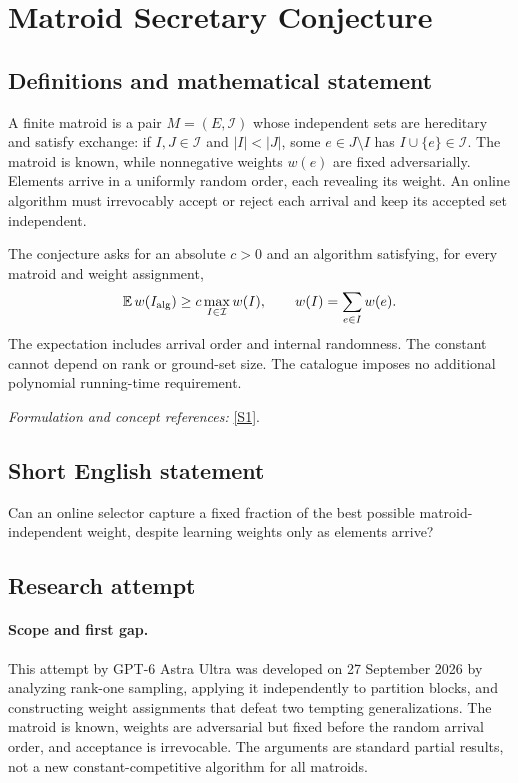 \documentclass[11pt]{article}
\begin{document}
\section*{\texorpdfstring{Matroid Secretary Conjecture}{Matroid Secretary Conjecture}}\label{statement}
\subsection{Definitions and mathematical statement}
A finite matroid is a pair $M=(E,\mathcal I)$ whose independent sets are hereditary and satisfy exchange: if $I,J\in\mathcal I$ and $|I|<|J|$, some $e\in J\setminus I$ has $I\cup\{e\}\in\mathcal I$. The matroid is known, while nonnegative weights $w(e)$ are fixed adversarially. Elements arrive in a uniformly random order, each revealing its weight. An online algorithm must irrevocably accept or reject each arrival and keep its accepted set independent.

The conjecture asks for an absolute $c>0$ and an algorithm satisfying, for every matroid and weight assignment,
\[
 {\mathbb{E}}\,w(I_{\rm alg})\ge c\max_{I\in\mathcal I}w(I),
 \qquad w(I)=\sum_{e\in I}w(e).
\]
The expectation includes arrival order and internal randomness. The constant cannot depend on rank or ground-set size. The catalogue imposes no additional polynomial running-time requirement.
\par\smallskip\textit{Formulation and concept references:} \href{https://drops.dagstuhl.de/storage/00lipics/lipics-vol215-itcs2022/LIPIcs.ITCS.2022.58/LIPIcs.ITCS.2022.58.pdf}{[S1]}.

\subsection{Short English statement}
Can an online selector capture a fixed fraction of the best possible matroid-independent weight, despite learning weights only as elements arrive?
\subsection{Research attempt}
\paragraph{Scope and first gap.}
This attempt by GPT-6 Astra Ultra was developed on 27 September 2026 by analyzing rank-one sampling, applying it independently to partition blocks, and constructing weight assignments that defeat two tempting generalizations. The matroid is known, weights are adversarial but fixed before the random arrival order, and acceptance is irrevocable. The arguments are standard partial results, not a new constant-competitive algorithm for all matroids.
\end{document}
